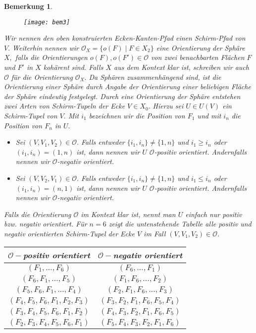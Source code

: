 \documentclass[12pt,titlepage,twoside,cleardoublepage]{article}
\theoremstyle{nummermitklammern}
\newtheorem{bemerkung}[temp]{Bemerkung}
\newtheorem{bemerkung}[zahl]{Bemerkung}
\numberwithin{equation}{section}
\begin{document}
\begin{bemerkung}
\begin{figure}[H]
\begin{center}
\texttt{[image: bem3]}
\end{center}
\end{figure}
Wir nennen den oben konstruierten Ecken-Kanten-Pfad einen \emph{Schirm-Pfad} von $V.$
Weiterhin nennen wir $\mathcal{O}_X=\{o(F)\mid F\in X_2\}$ eine Orientierung der Sphäre $X,$ falls die Orientierungen $o(F),o(F')\in \mathcal{O}$ von zwei benachbarten Flächen $F$ und $F'$ in $X$ kohärent sind. Falls $X$ aus dem Kontext klar ist, schreiben wir auch $\mathcal{O}$ für die Orientierung $\mathcal{O}_X.$ Da Sphären zusammenhängend sind, ist die  Orientierung einer Sphäre durch Angabe der Orientierung einer beliebigen Fläche der Sphäre eindeutig festgelegt. Durch eine Orientierung der Sphäre  entstehen zwei Arten von Schirm-Tupeln der Ecke $V\in X_0.$ Hierzu sei $U\in U(V)$ ein Schirm-Tupel von $V.$ Mit $i_1$ bezeichnen wir die Position von $F_1$ und mit $i_n$ die Position von $F_n$ in $U.$
\begin{itemize}
\item Sei
$(V,V_1,V_2)\in \mathcal{O}.$ Falls entweder $\{i_1,i_n\}\neq\{1,n\}$ und $i_1\geq i_n$ oder $(i_1,i_n)=(1,n)$ ist, dann nennen wir $U$ $\mathcal{O}$-positiv orientiert. Andernfalls nennen wir $\mathcal{O}$-negativ orientiert.
\item Sei $(V,V_2,V_1)\in \mathcal{O}.$ Falls entweder $\{i_1,i_n\}\neq \{1,n\}$ und $i_1\leq i_n$ oder $(i_1,i_n)=(n,1)$ ist, dann nennen wir $U$ $\mathcal{O}$-positiv orientiert. Andernfalls nennen wir  $\mathcal{O}$-negativ orientiert.
 \end{itemize}
Falls die Orientierung $\mathcal{O}$ im Kontext klar ist, nennt man $U$ einfach nur positiv bzw. negativ orientiert.
Für $n=6$ zeigt die untenstehende Tabelle alle positiv und negativ orientierten Schirm-Tupel der Ecke $V$ im Fall $(V,V_1,V_2) \in \mathcal{O}$.\\
\begin{center}
\begin{tabular}{|c|c|}
\hline
$\mathcal{O}-$positiv orientiert & $\mathcal{O}-$negativ orientiert\\
\hline
$(F_1,\ldots,F_6)$&$(F_6,\ldots ,F_1)$\\
$(F_6,F_1,\ldots,F_5)$&$(F_1,F_6,\ldots ,F_2)$\\
$(F_5,F_6,F_1,\ldots,F_4)$&$(F_2,F_1,F_6,\ldots,F_3)$\\
$(F_4,F_5,F_6,F_1,F_2,F_3)$&$(F_3,F_2,F_1,F_6,F_5,F_4)$\\
$(F_3,F_4,F_5,F_6,F_1,F_2)$&$(F_4,F_3,F_2,F_1,F_6,F_5)$\\
$(F_2,F_3,F_4,F_5,F_6,F_1)$&$(F_5,F_4,F_3,F_2,F_1,F_6)$\\
\hline
\end{tabular}
\end{center}
\end{bemerkung}
  
\end{document}
